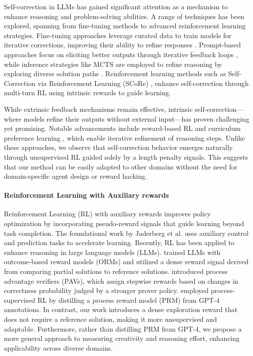 Self-correction in LLMs has gained significant attention as a mechanism to enhance reasoning and problem-solving abilities. A range of techniques has been explored, spanning from fine-tuning methods to advanced reinforcement learning strategies. 
Fine-tuning approaches leverage curated data to train models for iterative corrections, improving their ability to refine responses \cite{min2024imitate, qu2024recursive, zhang2024small}. 
Prompt-based approaches focus on eliciting better outputs through iterative feedback loops \cite{huang2023large}, while inference strategies like MCTS are employed to refine reasoning by exploring diverse solution paths \cite{zhang2024accessing, yang2024qwen2, tian2024toward, wang2024towards}. 
Reinforcement learning methods such as Self-Correction via Reinforcement Learning (SCoRe) \cite{kumar2024training}, enhance self-correction through multi-turn RL using intrinsic rewards to guide learning.

While extrinsic feedback mechanisms remain effective, intrinsic self-correction—where models refine their outputs without external input—has proven challenging yet promising. Notable advancements include reward-based RL \cite{yang2024qwen2, choi2024self, kumar2024training} and curriculum preference learning \cite{wang2024towards}, which enable iterative refinement of reasoning steps. 
Unlike these approaches, we observe that self-correction behavior emerges naturally through unsupervised RL guided solely by a length penalty signals. This suggests that our method can be easily adapted to other domains without the need for domain-specific agent design or reward hacking.


\paragraph{Reinforcement Learning with Auxiliary rewards}

Reinforcement Learning (RL) with auxiliary rewards improves policy optimization by incorporating pseudo-reward signals that guide learning beyond task completion. 
The foundational work by Jaderberg et al. \cite{jaderberg2016reinforcement} uses auxiliary control and prediction tasks to accelerate learning. Recently, RL has been applied to enhance reasoning in large language models (LLMs). 
\cite{havrilla2024teaching} trained LLMs with outcome-based reward models (ORMs) and utilized a dense reward signal derived from comparing partial solutions to reference solutions.
\cite{setlur2024rewarding} introduced process advantage verifiers (PAVs), which assign stepwise rewards based on changes in correctness probability judged by a stronger prover policy.
\cite{luo2023wizardmath} employed process-supervised RL by distilling a process reward model (PRM) from GPT-4 annotations. In contrast, our work introduces a dense exploration reward that does not require a reference solution, making it more unsupervised and adaptable. Furthermore, rather than distilling PRM from GPT-4, we propose a more general approach to measuring creativity and reasoning effort, enhancing applicability across diverse domains.